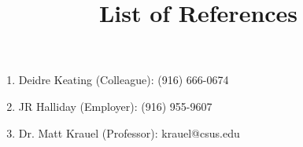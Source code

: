 \documentclass[12pt]{article}
\theoremstyle{definition}
\theoremstyle{definition}
\begin{document}
\title{List of References}
\maketitle

\begin{enumerate}
    \item Deidre Keating (Colleague): (916) 666-0674
    \item JR Halliday (Employer): (916) 955-9607
    \item Dr. Matt Krauel (Professor): krauel@csus.edu
\end{enumerate}
\end{document}
